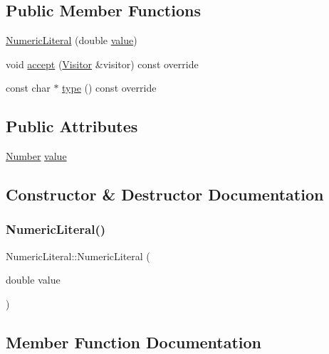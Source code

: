 \subsection*{Public Member Functions}
\begin{DoxyCompactItemize}
\item 
\hyperlink{struct_numeric_literal_a7d8479432e5f17a657279050ca611e33}{Numeric\+Literal} (double \hyperlink{struct_numeric_literal_a2e20d1fe98e8ee4558f244859be6bd84}{value})
\item 
void \hyperlink{struct_numeric_literal_aa18c06c1b739ba725cad0593c6bde1f4}{accept} (\hyperlink{struct_visitor}{Visitor} \&visitor) const override
\item 
const char $\ast$ \hyperlink{struct_numeric_literal_a685ec9d2678a8fb5df8b4ec1a580b762}{type} () const override
\end{DoxyCompactItemize}
\subsection*{Public Attributes}
\begin{DoxyCompactItemize}
\item 
\hyperlink{struct_number}{Number} \hyperlink{struct_numeric_literal_a2e20d1fe98e8ee4558f244859be6bd84}{value}
\end{DoxyCompactItemize}


\subsection{Constructor \& Destructor Documentation}
\mbox{\label{struct_numeric_literal_a7d8479432e5f17a657279050ca611e33}} 
\subsubsection{\texorpdfstring{Numeric\+Literal()}{NumericLiteral()}}
{\footnotesize\ttfamily Numeric\+Literal\+::\+Numeric\+Literal (\begin{DoxyParamCaption}\item[{double}]{value }\end{DoxyParamCaption})\hspace{0.3cm}{\ttfamily [inline]}}



\subsection{Member Function Documentation}
\mbox{\label{struct_numeric_literal_aa18c06c1b739ba725cad0593c6bde1f4}} 
